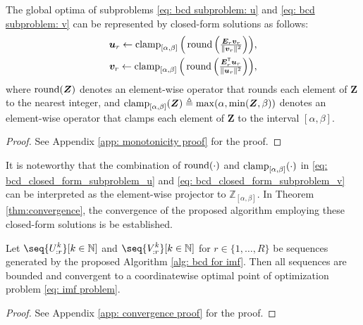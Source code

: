 \begin{theorem}[Monotonicity] \label{the: bcd subproblem}
    The global optima of subproblems \eqref{eq: bcd subproblem: u} and \eqref{eq: bcd subproblem: v} can be represented by closed-form solutions as follows:
    \begin{align} 
            \textstyle \bm{u}_r \gets \operatorname{clamp}_{[\alpha,\beta]}\Big(\operatorname{round}\Big(\frac{\bm{E}_r \bm{v}_r}{\lVert \bm{v}_r \rVert^2}\Big)\Big), \label{eq: bcd_closed_form_subproblem_u}\\
            \textstyle \bm{v}_r \gets \operatorname{clamp}_{[\alpha,\beta]}\Big(\operatorname{round}\Big(\frac{\bm{E}_r^\mathsf{T} \bm{u}_r}{\lVert \bm{u}_r \rVert^2}\Big)\Big),             
        \label{eq: bcd_closed_form_subproblem_v}
    \end{align}
    where $\operatorname{round}(\bm{Z})$ denotes an element-wise operator that rounds each element of $\bm{Z}$ to the nearest integer, and $\operatorname{clamp}_{[\alpha,\beta]}(\bm{Z}) \triangleq \max(\alpha, \min(\bm{Z}, \beta))$ denotes an element-wise operator that clamps each element of $\bm{Z}$ to the interval $[\alpha,\beta]$.
\end{theorem}
\begin{proof}
	See Appendix \ref{app: monotonicity proof} for the proof.
\end{proof}

It is noteworthy that the combination of $\operatorname{round}(\cdot)$ and $\operatorname{clamp}_{[\alpha,\beta]}(\cdot)$ in \eqref{eq: bcd_closed_form_subproblem_u} and \eqref{eq: bcd_closed_form_subproblem_v} can be interpreted as the element-wise projector to $\mathbb{Z}_{[\alpha,\beta]}$. In Theorem \ref{thm:convergence}, the convergence of the proposed algorithm employing these closed-form solutions is be established.

\begin{theorem}\label{thm:convergence}
    Let $\seq{\displaystyle U_{:r}^{k}}[k\in\N]$ and $\seq{\displaystyle V_{:r}^{k}}[k\in\N]$ for $r\in \{1,\dots,R\}$ be sequences generated by the proposed Algorithm \ref{alg: bcd for imf}. Then all sequences are bounded and convergent to a coordinatewise optimal point of optimization problem \eqref{eq: imf problem}.
\end{theorem}
\begin{proof}
    See Appendix \ref{app: convergence proof} for the proof.
\end{proof}

